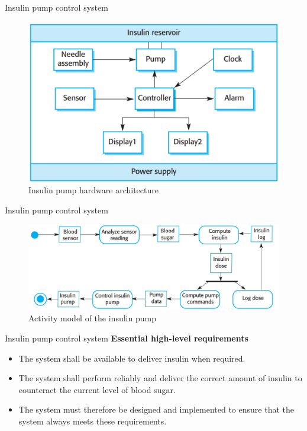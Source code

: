 \documentclass{beamer}
\begin{document}
\begin{frame}{Insulin pump control system}
\begin{figure}
	\includegraphics[scale=.4]{img/m1_1.jpg}
	\caption{Insulin pump 
		hardware architecture}
\end{figure}
\end{frame}
\begin{frame}{Insulin pump control system}
	\begin{figure}
		\includegraphics[scale=.35]{img/m1_2.jpg}
		\caption{Activity 
			model of the 
			insulin pump}
	\end{figure}
\end{frame}
\begin{frame}{Insulin pump control system}
	\textbf{Essential high-level requirements}
	\begin{itemize}
		\item The system shall be available to deliver insulin when required. 
		\item The system shall perform reliably and deliver the correct amount of insulin to counteract the current level of blood sugar.
		\item The system must therefore be designed and implemented to ensure that the system always meets these requirements. 
	\end{itemize}
\end{frame}
\end{document}
